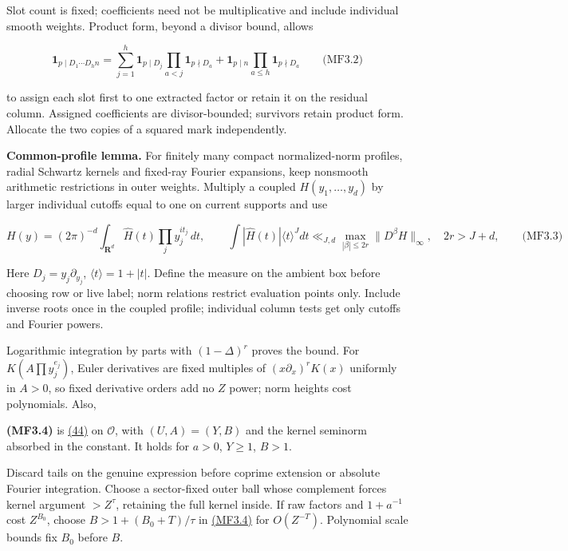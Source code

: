 Slot count is fixed; coefficients need not be multiplicative and include individual smooth weights. Product form, beyond a divisor bound, allows

\hypertarget{mf:eq:B3.2}{}

\label{mf:eq:B3.2}

\[
\mathbf1_{p\mid D_1\cdots D_h n}
=\sum_{j=1}^h\mathbf1_{p\mid D_j}\prod_{a<j}\mathbf1_{p\nmid D_a}
 +\mathbf1_{p\mid n}\prod_{a\le h}\mathbf1_{p\nmid D_a}
\qquad\text{(MF3.2)}
\]

to assign each slot first to one extracted factor or retain it on the residual column. Assigned coefficients are divisor-bounded; survivors retain product form. Allocate the two copies of a squared mark independently.

\textbf{Common-profile lemma.} For finitely many compact normalized-norm profiles, radial Schwartz kernels and fixed-ray Fourier expansions, keep nonsmooth arithmetic restrictions in outer weights. Multiply a coupled \(H(y_1,\ldots,y_d)\) by larger individual cutoffs equal to one on current supports and use

\hypertarget{mf:eq:B3.3}{}

\label{mf:eq:B3.3}

\[
H(y)=(2\pi)^{-d}\int_{\mathbf R^d}\widehat H(t)\prod_jy_j^{it_j}\,dt,
\qquad
\int|\widehat H(t)|\langle t\rangle^Jdt
 \ll_{J,d}\max_{|\beta|\le2r}\|D^\beta H\|_\infty,
\quad 2r>J+d,
\qquad\text{(MF3.3)}
\]

Here \(D_j=y_j\partial_{y_j}\), \(\langle t\rangle=1+|t|\). Define the measure on the ambient box before choosing row or live label; norm relations restrict evaluation points only. Include inverse roots once in the coupled profile; individual column tests get only cutoffs and Fourier powers.

Logarithmic integration by parts with \((1-\Delta)^r\) proves the bound. For \(K(A\prod y_j^{e_j})\), Euler derivatives are fixed multiples of \((x\partial_x)^rK(x)\) uniformly in \(A>0\), so fixed derivative orders add no \(Z\) power; norm heights cost polynomials. Also,

\hypertarget{mf:eq:B3.4}{}

\label{mf:eq:B3.4}

\textbf{(MF3.4)} is \protect\hyperlink{cf:eq:B.25}{(44)} on \(\mathcal O\), with \((U,A)=(Y,B)\) and the kernel seminorm absorbed in the constant. It holds for \(a>0\), \(Y\ge1\), \(B>1\).

Discard tails on the genuine expression before coprime extension or absolute Fourier integration. Choose a sector-fixed outer ball whose complement forces kernel argument \(>Z^\tau\), retaining the full kernel inside. If raw factors and \(1+a^{-1}\) cost \(Z^{B_0}\), choose \(B>1+(B_0+T)/\tau\) in \protect\hyperlink{mf:eq:B3.4}{(MF3.4)} for \(O(Z^{-T})\). Polynomial scale bounds fix \(B_0\) before \(B\).

